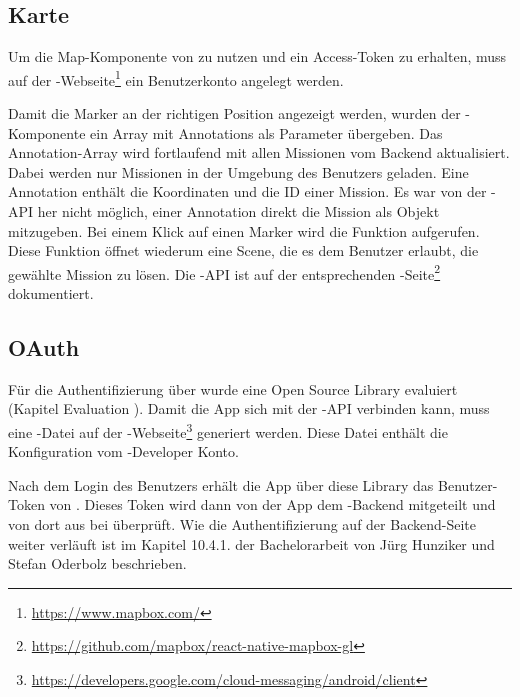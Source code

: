 \subsection{Karte}
Um die Map-Komponente von  zu nutzen und ein Access-Token zu erhalten, muss auf der -Webseite\footnote{\url{https://www.mapbox.com/}} ein Benutzerkonto angelegt werden. 

Damit die Marker an der richtigen Position angezeigt werden, wurden der -Komponente ein Array mit Annotations als Parameter übergeben. 
Das Annotation-Array wird fortlaufend mit allen Missionen vom \gls{Backend} aktualisiert. 
Dabei werden nur Missionen in der Umgebung des Benutzers geladen. 
Eine Annotation enthält die Koordinaten und die ID einer Mission. 
Es war von der -\gls{API} her nicht möglich, einer Annotation direkt die Mission als Objekt mitzugeben. 
Bei einem Klick auf einen Marker wird die Funktion  aufgerufen.
Diese Funktion öffnet wiederum eine Scene, die es dem Benutzer erlaubt, die gewählte Mission zu lösen.
Die -\gls{API} ist auf der entsprechenden -Seite\footnote{\url{https://github.com/mapbox/react-native-mapbox-gl}} dokumentiert. 


\subsection{OAuth}
Für die Authentifizierung über  wurde eine Open Source \gls{Library} evaluiert (Kapitel Evaluation ). 
Damit die App sich mit der -\gls{API} verbinden kann, muss eine -Datei auf der -Webseite\footnote{\url{https://developers.google.com/cloud-messaging/android/client}} generiert werden. 
Diese Datei enthält die Konfiguration vom -Developer Konto. 

Nach dem Login des Benutzers erhält die App über diese \gls{Library} das Benutzer-Token von .
Dieses Token wird dann von der App dem \kort{}-\gls{Backend} mitgeteilt und von dort aus bei  überprüft. 
Wie die Authentifizierung auf der \gls{Backend}-Seite weiter verläuft ist im Kapitel 10.4.1. der Bachelorarbeit von Jürg Hunziker und Stefan Oderbolz beschrieben.\cite{ba-kort-2012}